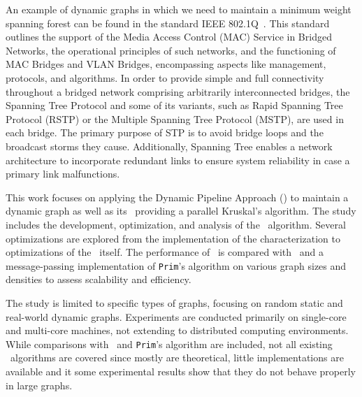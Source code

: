 An example of dynamic graphs in which we need to maintain a minimum weight spanning forest can be found in the standard IEEE 802.1Q~\cite{IEEE8021Q}. This standard outlines the support of the Media Access Control (MAC) Service in Bridged Networks, the operational principles of such networks, and the functioning of MAC Bridges and VLAN Bridges, encompassing aspects like management, protocols, and algorithms. In order to provide simple and full connectivity throughout a bridged network comprising arbitrarily interconnected bridges, the Spanning Tree Protocol and some of its variants, such as Rapid Spanning Tree Protocol (RSTP) or the Multiple Spanning Tree Protocol (MSTP), are used in each bridge. The primary purpose of STP is to avoid bridge loops and the broadcast storms they cause. Additionally, Spanning Tree enables a network architecture to incorporate redundant links to ensure system reliability in case a primary link malfunctions.


This work focuses on applying the Dynamic Pipeline Approach (\dpm) \cite{Pasarella2024} to maintain a dynamic graph as well as its \mst\ providing a  parallel Kruskal's algorithm. The study includes the development, optimization, and analysis of the \DPmst\ algorithm. 
Several optimizations are explored from the implementation of the characterization to optimizations of the \dpm\ itself. The performance of \DPmst\ is compared with \FKruskal\ and a message-passing implementation of {\tt Prim}'s algorithm on various graph sizes and densities to assess scalability and efficiency.



The study is limited to specific types of graphs, focusing on random static and real-world dynamic graphs. Experiments are conducted primarily on single-core and multi-core machines, not extending to distributed computing environments. While comparisons with \FKruskal\ and {\tt Prim}'s algorithm are included, not all existing \mst\ algorithms are covered since mostly are theoretical, little implementations are available and it some experimental results show that they do not behave properly in large graphs.

